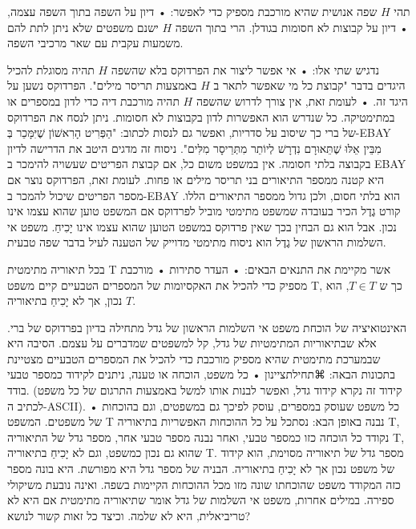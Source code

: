     תהי $H$ שפה אנושית שהיא מורכבת מספיק כדי לאפשר:
        • דיון על השפה בתוך השפה עצמה,
        • דיון על קבוצות לא חסומות בגודלן.
        הרי בתוך השפה $H$ ישנם משפטים שלא ניתן לתת להם משמעות עקבית עם שאר מרכיבי השפה.
 
    
    נדגיש שתי אלו:
        • אי אפשר ליצור את הפרדוקס בלא שהשפה $H$ תהיה מסוגלת להכיל היגדים בדבר "קבוצת כל מי שאפשר לתאר ב $H$ באמצעות תריסר מילים". הפרדוקס נשען על היגד זה.
        • לעומת זאת, אין צורך לדרוש שהשפה $H$ תהיה מורכבת דיה כדי לדון במספרים או במתימטיקה. כל שנדרש הוא האפשרות לדון בקבוצות לא חסומות. ניתן לנסח את הפרדוקס של ברי כך שיסוב על סדריות, ואפשר גם לנסות לכתוב: "הַפְּרִיט הָרִאשׁוֹן שֶׁיִּמָּכֵר בְּ-EBAY מִבֵּין אֵלּוּ שֶׁתֵּאוּרָם נִדְרָשׁ לְיוֹתֵר מִתְּרֵיסָר מִלִּים". ניסוח זה מדגים היטב את הדרישה לדיון בקבוצה בלתי חסומה. אין במשפט משום כל, אם קבוצת הפריטים שעשויה להימכר ב EBAY היא קטנה ממספר התיאורים בני תריסר מילים או פחות. לעומת זאת, הפרדוקס נוצר אם מספר הפריטים שיכול להמכר ב-EBAY הוא בלתי חסום, ולכן גדול ממספר התיאורים הללו.
        קורט גֶדֶל הכיר בעובדה שמשפט מתימטי מוביל לפרדוקס אם המשפט טוען שהוא עצמו אינו נכון. אבל הוא גם הבחין בכך שאין פרדוקס במשפט הטוען שהוא עצמו אינו יָכִיחַ. משפט אי השלמות הראשון של גֶדֶל הוא ניסוח מתימטי מדוייק של הטענה לעיל בדבר שפה טבעית.
    
    בכל תיאוריה מתימטית T אשר מקיימת את התנאים הבאים:
        • העדר סתירות
        • מורכבת מספיק כדי להכיל את האקסיומות של המספרים הטבעיים
        קיים משפט T, כך ש $T∈T$, הוא נכון, אך לא יָכִיחַ בתיאוריה $T$.
    
    האינטואיציה של הוכחת משפט אי השלמות הראשון של גדל מתחילה בדיון בפרדוקס של ברי.
    אלא שבתיאוריות המתימטיות של גדל, קל למשפטים שמדברים על עצמם. הסיבה היא שבמערכת
    מתימטית שהיא מספיק מורכבת כדי להכיל את המספרים הטבעיים מצטיינת בתכונות הבאה: 
⌘תחילת{ציינון}
   • כל משפט, הוכחה או טענה, ניתנים לקידוד כמספר טבעי בודד. (קידוד זה נקרא קידוד     גדל, ואפשר לבנות אותו למשל באמצעות התרגום של כל משפט לכתיב ה-ASCII). 
   •  כל משפט
    שעוסק במספרים, עוסק לפיכך גם במשפטים, וגם בהוכחות של משפטים. המשפט T נבנה
    באופן הבא: נסתכל על כל ההוכחות האפשריות בתיאוריה T, נקודד כל הוכחה כזו כמספר
    טבעי, ואחר נבנה מספר טבעי אחר, מספר גדל של התיאוריה T, שהוא גם נכון כמשפט, וגם
    לא יָכִיחַ בתיאוריה T. מספר גדל של תיאוריה מסוימת, הוא קידוד של משפט נכון
    אך לא יָכִיחַ בתיאוריה. הבניה של מספר גדל היא מפורשת. היא בונה מספר כזה המקודד
    משפט שהוכחתו שונה מזו מכל ההוכחות הקיימות בשפה. ואינה נובעת משיקולי ספירה.
    במילים אחרות, משפט אי השלמות של גדל אומר שתיאוריה מתימטית אם היא לא טריביאלית,
    היא לא שלמה. וכיצד כל זאות קשור לנושא?
    

